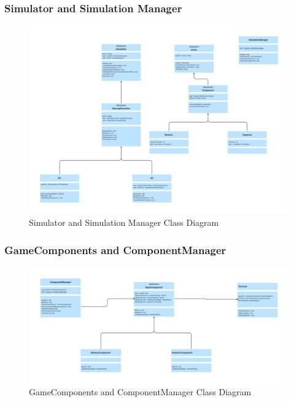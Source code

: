 \documentclass[../main.tex]{subfiles}
\begin{document}
\subsubsection{Simulator and Simulation Manager}

\begin{figure}[h!t]
\centering
\includegraphics[scale=0.12]{images/chapter3/Class1.png}
\caption{Simulator and Simulation Manager Class Diagram}
\label{Simulator and Simulation Manager}
\end{figure}

\subsubsection{GameComponents and ComponentManager}

\begin{figure}[h!t]
\centering
\includegraphics[scale=0.12]{images/chapter3/Class2.png}
\caption{GameComponents and ComponentManager Class Diagram}
\label{GameComponents and ComponentManager }
\end{figure}
\newpage
\end{document}
